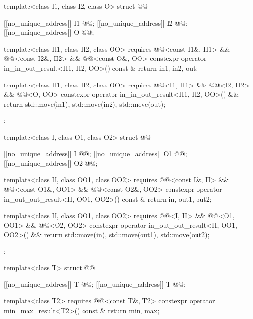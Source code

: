 \begin{codeblock}
{  template<class I1, class I2, class O>
  struct @@ {
    [[no_unique_address]] I1 @@;
    [[no_unique_address]] I2 @@;
    [[no_unique_address]] O  @@;

    template<class II1, class II2, class OO>
      requires @@<const I1&, II1> &&
               @@<const I2&, II2> &&
               @@<const O&, OO>
    constexpr operator in_in_out_result<II1, II2, OO>() const & {
      return {in1, in2, out};
    }

    template<class II1, class II2, class OO>
      requires @@<I1, II1> &&
               @@<I2, II2> &&
               @@<O, OO>
    constexpr operator in_in_out_result<II1, II2, OO>() && {
      return {std::move(in1), std::move(in2), std::move(out)};
    }
  };

  template<class I, class O1, class O2>
  struct @@ {
    [[no_unique_address]] I  @@;
    [[no_unique_address]] O1 @@;
    [[no_unique_address]] O2 @@;

    template<class II, class OO1, class OO2>
      requires @@<const I&, II> &&
               @@<const O1&, OO1> &&
               @@<const O2&, OO2>
    constexpr operator in_out_out_result<II, OO1, OO2>() const & {
      return {in, out1, out2};
    }

    template<class II, class OO1, class OO2>
      requires @@<I, II> &&
               @@<O1, OO1> &&
               @@<O2, OO2>
    constexpr operator in_out_out_result<II, OO1, OO2>() && {
      return {std::move(in), std::move(out1), std::move(out2)};
    }
  };

  template<class T>
  struct @@ {
    [[no_unique_address]] T @@;
    [[no_unique_address]] T @@;

    template<class T2>
      requires @@<const T&, T2>
    constexpr operator min_max_result<T2>() const & {
      return {min, max};
    }

}}
\end{codeblock}

